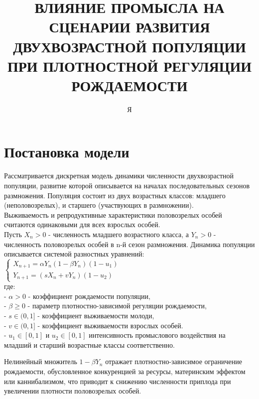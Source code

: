 \documentclass[fleqn]{article}
\begin{document}
\title{ВЛИЯНИЕ ПРОМЫСЛА НА СЦЕНАРИИ РАЗВИТИЯ ДВУХВОЗРАСТНОЙ ПОПУЛЯЦИИ ПРИ ПЛОТНОСТНОЙ РЕГУЛЯЦИИ РОЖДАЕМОСТИ}
\author{Я}
\maketitle

\tableofcontents
\newpage

\section{Постановка модели}
    Рассматривается дискретная модель динамики численности двухвозрастной популяции, 
    развитие которой описывается на началах последовательных сезонов размножения. 
    Популяция состоит из двух возрастных классов: младшего (неполовозрелых), и старшего (участвующих в размножении). \\
    Выживаемость и репродуктивные характеристики половозрелых особей считаются одинаковыми для всех взрослых особей. \\
    Пусть $X_n>0$ - численность младшего возрастного класса, а $Y_n>0$ - численность половозрелых особей в n-й сезон размножения. Динамика популяции описывается системой разностных уравнений: \\
$
\begin{cases}
X_{n+1} = \alpha Y_n(1-\beta Y_n)(1-u_1) \\
Y_{n+1} = (sX_n + vY_n)(1-u_2)
\end{cases}
$ \\
где: \\
 - $\alpha > 0$ - коэффициент рождаемости популяции, \\
 - $\beta \ge 0$ - параметр плотностно-зависимой регуляции рождаемости,  \\
 - $s \in (0,1]$ - коэффициент выживаемости молоди, \\
 - $v \in (0,1]$ - коэффициент выживаемости взрослых особей. \\
 - $u_1 \in [0,1]$ и $u_2 \in [0,1]$  интенсивность 
промыслового воздействия на младший и старший возрастные классы соответственно.

Нелинейный множитель $1 - \beta Y_n$ отражает плотностно-зависимое ограничение
рождаемости, обусловленное конкуренцией за ресурсы, материнским эффектом или
каннибализмом, что приводит к снижению численности приплода при увеличении
плотности половозрелых особей.
\end{document}
